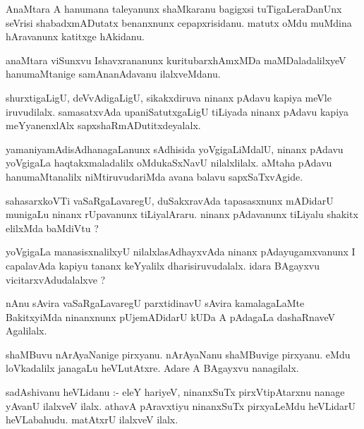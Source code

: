 \documentclass{article}
\begin{document}
\begin{mn}
AnaMtara  A  hanumana  taleyanunx  shaMkaranu  bagigxsi  tuTigaLeraDanUnx  seVrisi  shabadxmADutatx  
benanxnunx  cepapxrisidanu.  matutx  oMdu  muMdina  hAravanunx  katitxge  hAkidanu.
\end{mn}

\begin{mn}
anaMtara  viSunxvu  Ishavxrananunx  kuritubarxhAmxMDa  maMDaladalilxyeV  hanumaMtanige  samAnanAdavanu  ilalxveMdanu.
\end{mn}

\begin{mn}
shurxtigaLigU,  deVvAdigaLigU,  sikakxdiruva  ninanx  pAdavu  kapiya  meVle  iruvudilalx.  samasatxvAda  
upaniSatutxgaLigU  tiLiyada  ninanx  pAdavu  kapiya  meYyanenxlAlx  sapxshaRmADutitxdeyalalx.
\end{mn}

\begin{mn}
yamaniyamAdisAdhanagaLanunx  sAdhisida  yoVgigaLiMdalU,  ninanx  pAdavu  yoVgigaLa  haqtakxmaladalilx  
oMdukaSxNavU  nilalxlilalx.  aMtaha  pAdavu  hanumaMtanalilx  niMtiruvudariMda  avana  balavu  sapxSaTxvAgide.
\end{mn}

\begin{mn}
sahasarxkoVTi  vaSaRgaLavaregU,  duSakxravAda  tapasasxnunx  mADidarU  munigaLu  ninanx  rUpavanunx  
tiLiyalAraru.  ninanx  pAdavanunx  tiLiyalu  shakitx  elilxMda  baMdiVtu ?
\end{mn}

\begin{mn}
yoVgigaLa  manasisxnalilxyU  nilalxlasAdhayxvAda  ninanx  pAdayugamxvanunx  I  capalavAda  kapiyu  
tananx  keYyalilx  dharisiruvudalalx.  idara  BAgayxvu  vicitarxvAdudalalxve ?
\end{mn}

\begin{mn}
nAnu  sAvira  vaSaRgaLavaregU  parxtidinavU  sAvira  kamalagaLaMte  BakitxyiMda  ninanxnunx  pUjemADidarU  
kUDa  A  pAdagaLa  dashaRnaveV  Agalilalx.
\end{mn}

\begin{mn}
shaMBuvu  nArAyaNanige  pirxyanu.  nArAyaNanu  shaMBuvige  pirxyanu.  eMdu  loVkadalilx  janagaLu  
heVLutAtxre.  Adare  A  BAgayxvu  nanagilalx.
\end{mn}

\begin{mn}
sadAshivanu  heVLidanu :- eleY  hariyeV,  ninanxSuTx  pirxVtipAtarxnu  nanage  yAvanU  ilalxveV  ilalx.  
athavA  pAravxtiyu  ninanxSuTx  pirxyaLeMdu  heVLidarU  heVLabahudu.  matAtxrU  ilalxveV  ilalx.
\end{mn}
\end{document}

